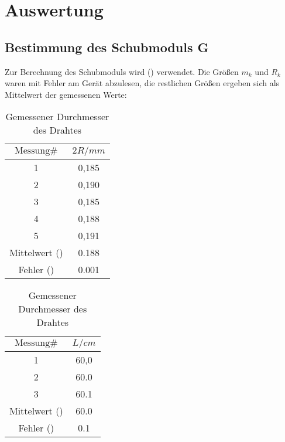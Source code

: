 \documentclass{scrartcl}
\begin{document}
\section{Auswertung}
\label{sec:Auswertung}

\subsection{Bestimmung des Schubmoduls G}

Zur Berechnung des Schubmoduls wird () verwendet.
Die Größen $m_k$ und $R_k$ waren mit Fehler am Gerät abzulesen,
die restlichen Größen ergeben sich als Mittelwert der gemessenen Werte:

\begin{table}
\centering
\caption{Gemessener Durchmesser des Drahtes}
\label{tab:Dicke}
\begin{tabular}{ c S[table-format=1.3] }
\toprule
$\text{Messung#}$ & $2R/mm$ \\
 & 0,185   \\
2 & 0,190   \\
3 & 0,185   \\
4 & 0,188   \\
5 & 0,191   \\
\midrule
Mittelwert () & 0.188 \\
Fehler () & 0.001\\
\bottomrule
\end{tabular}
\end{table}

\begin{table}
\centering
\caption{Gemessener Durchmesser des Drahtes}
\label{tab:Dicke}
\begin{tabular}{ c S[table-format=2.1] }
\toprule
$\text{Messung#}$ & $L/cm$ \\
 & 60,0   \\
2 & 60.0   \\
3 & 60.1   \\
\midrule
Mittelwert () & 60.0 \\
Fehler () & 0.1 \\
\bottomrule
\end{tabular}
\end{table}
\end{document}
